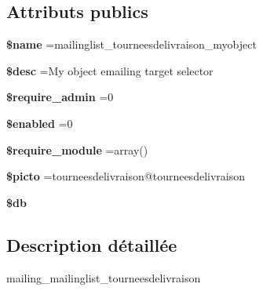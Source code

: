 \subsection*{Attributs publics}
\begin{DoxyCompactItemize}
\item 
\mbox{\label{classmailing__mailinglist__tourneesdelivraison__myobject_aaba306930f1fe499646224542a98350f}} 
{\bfseries \$name} =\textquotesingle{}mailinglist\+\_\+tourneesdelivraison\+\_\+myobject\textquotesingle{}
\item 
\mbox{\label{classmailing__mailinglist__tourneesdelivraison__myobject_ab397885ead4f230ee791d7e48e19ba0f}} 
{\bfseries \$desc} =\textquotesingle{}My object emailing target selector\textquotesingle{}
\item 
\mbox{\label{classmailing__mailinglist__tourneesdelivraison__myobject_a49d015dde7a5821f83b7b5ffaeede433}} 
{\bfseries \$require\+\_\+admin} =0
\item 
\mbox{\label{classmailing__mailinglist__tourneesdelivraison__myobject_aac567012d237682f3561d0c2734a61fe}} 
{\bfseries \$enabled} =0
\item 
\mbox{\label{classmailing__mailinglist__tourneesdelivraison__myobject_a648edef66e1c89dd5fff7510e577c004}} 
{\bfseries \$require\+\_\+module} =array()
\item 
\mbox{\label{classmailing__mailinglist__tourneesdelivraison__myobject_a11cee74fa130514d5a5b024194cdaec1}} 
{\bfseries \$picto} =\textquotesingle{}tourneesdelivraison@tourneesdelivraison\textquotesingle{}
\item 
\mbox{\label{classmailing__mailinglist__tourneesdelivraison__myobject_aacaa1038e20bd87105657109bbc27d26}} 
{\bfseries \$db}
\end{DoxyCompactItemize}


\subsection{Description détaillée}
mailing\+\_\+mailinglist\+\_\+tourneesdelivraison 


